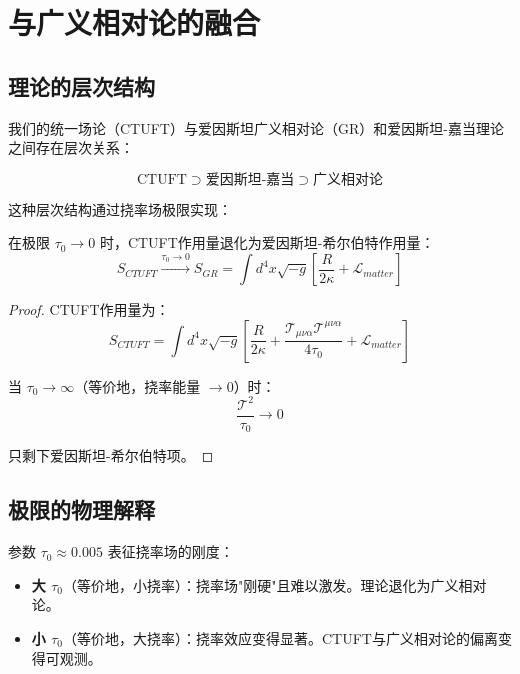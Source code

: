 \section{与广义相对论的融合}
\label{sec:gr_integration}

\subsection{理论的层次结构}

我们的统一场论（CTUFT）与爱因斯坦广义相对论（GR）和爱因斯坦-嘉当理论之间存在层次关系：

\begin{equation}
    \text{CTUFT} \supset \text{爱因斯坦-嘉当} \supset \text{广义相对论}
    \label{eq:theory_hierarchy}
\end{equation}

这种层次结构通过挠率场极限实现：

\begin{theorem}[CTUFT的GR极限]
在极限 $\tau_0 \to 0$ 时，CTUFT作用量退化为爱因斯坦-希尔伯特作用量：
\begin{equation}
    S_{CTUFT} \xrightarrow{\tau_0 \to 0} S_{GR} = \int d^4x \sqrt{-g} \left[\frac{R}{2\kappa} + \mathcal{L}_{matter}\right]
\end{equation}
\end{theorem}

\begin{proof}
CTUFT作用量为：
\begin{equation}
    S_{CTUFT} = \int d^4x \sqrt{-g} \left[\frac{R}{2\kappa} + \frac{\mathcal{T}_{\mu\nu\alpha}\mathcal{T}^{\mu\nu\alpha}}{4\tau_0} + \mathcal{L}_{matter}\right]
\end{equation}

当 $\tau_0 \to \infty$（等价地，挠率能量 $\to 0$）时：
\begin{equation}
    \frac{\mathcal{T}^2}{\tau_0} \to 0
\end{equation}

只剩下爱因斯坦-希尔伯特项。
\end{proof}

\subsection{极限的物理解释}

参数 $\tau_0 \approx 0.005$ 表征挠率场的刚度：

\begin{itemize}
    \item \textbf{大 $\tau_0$}（等价地，小挠率）：挠率场"刚硬"且难以激发。理论退化为广义相对论。
    \item \textbf{小 $\tau_0$}（等价地，大挠率）：挠率效应变得显著。CTUFT与广义相对论的偏离变得可观测。
\end{itemize}

